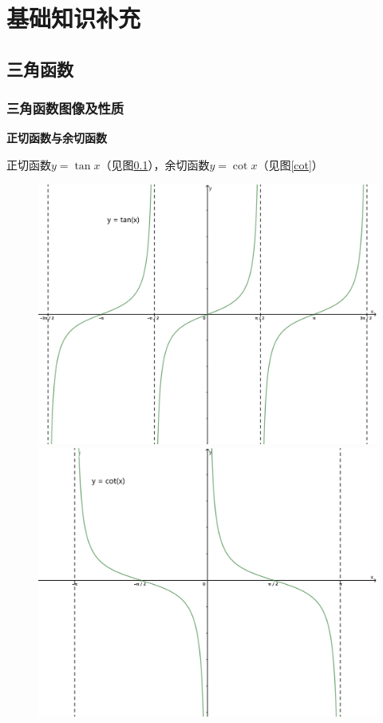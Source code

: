\chapter*{基础知识补充}

\section{三角函数}
\subsection{三角函数图像及性质}
\textbf{正切函数与余切函数}

正切函数$y=\tan x$（见图\ref{tan}），余切函数$y=\cot x$（见图\ref{cot}）
\begin{figure}[H]
\centering
\begin{minipage}{0.4\linewidth}
    \centerline{\includegraphics[width=\textwidth]{figure/tan_plot.png}}
    \caption{} \label{tan}
\end{minipage}
    \qquad
\begin{minipage}{0.4\linewidth}
    \centerline{\includegraphics[width=\textwidth]{figure/cot_plot.png}}

\end{minipage}
\end{figure}
